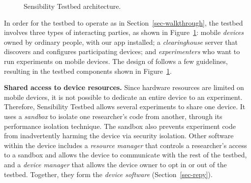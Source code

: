 \begin{figure}
\caption{\small Sensibility Testbed architecture. \label{fig-arch}}
\end{figure}

In order for the testbed to operate as in Section~\ref{sec-walkthrough},
the testbed involves three types of interacting
parties, as shown in Figure~\ref{fig-arch}: mobile \textit{devices} 
owned by ordinary people, with our app installed; a 
\textit{clearinghouse} server that discovers and configures
participating devices; and \textit{experimenters} who want to run
experiments on mobile devices. The design of \sysname follows
a few guidelines, resulting in the testbed components
shown in Figure~\ref{fig-arch}.

\textbf{Shared access to device resources.} 
Since hardware resources are limited on mobile devices, it is 
not possible to dedicate an entire device to an experiment. Therefore, 
Sensibility Testbed allows several experiments to share one device. It 
uses a \textit{sandbox} to isolate one researcher's code from 
 another, through its performance isolation technique. The sandbox 
also prevents experiment code from inadvertently harming the device
via security isolation. Other software within the device includes a 
\textit{resource manager} that controls a researcher's access to a sandbox 
and allows the device to communicate with the rest of the testbed, 
and a \textit{device manager} that allows the device 
owner to opt in or out of the testbed. Together, they form the
\textit{device software} (Section~\ref{sec-repy}).

